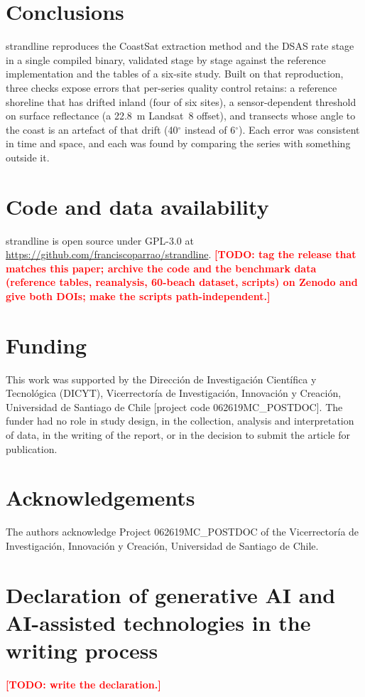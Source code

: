 \documentclass[authoryear,preprint,review,12pt]{elsarticle}
\newcommand{\todo}[1]{\textcolor{red}{\textbf{[TODO: #1]}}}
\begin{document}
\section{Conclusions}
strandline reproduces the CoastSat extraction method and the DSAS rate stage
in a single compiled binary, validated stage by stage against the reference
implementation and the tables of a six-site study. Built on that reproduction,
three checks expose errors that per-series quality control retains: a reference
shoreline that has drifted inland (four of six sites), a sensor-dependent
threshold on surface reflectance (a 22.8~m Landsat~8 offset), and transects
whose angle to the coast is an artefact of that drift (40$^\circ$ instead of
6$^\circ$). Each error was consistent in time and space, and each was found by
comparing the series with something outside it.

\section*{Code and data availability}\label{sec:availability}
strandline is open source under GPL-3.0 at
\url{https://github.com/franciscoparrao/strandline}.
\todo{tag the release that matches this paper; archive the code and the
benchmark data (reference tables, reanalysis, 60-beach dataset, scripts) on
Zenodo and give both DOIs; make the scripts path-independent.}

\section*{Funding}
This work was supported by the Dirección de Investigación Científica y
Tecnológica (DICYT), Vicerrectoría de Investigación, Innovación y Creación,
Universidad de Santiago de Chile [project code 062619MC\_POSTDOC]. The funder
had no role in study design, in the collection, analysis and interpretation of
data, in the writing of the report, or in the decision to submit the article
for publication.

\section*{Acknowledgements}
The authors acknowledge Project 062619MC\_POSTDOC of the Vicerrectoría de
Investigación, Innovación y Creación, Universidad de Santiago de Chile.

\section*{Declaration of generative AI and AI-assisted technologies in the writing process}
\todo{write the declaration.}



\end{document}
